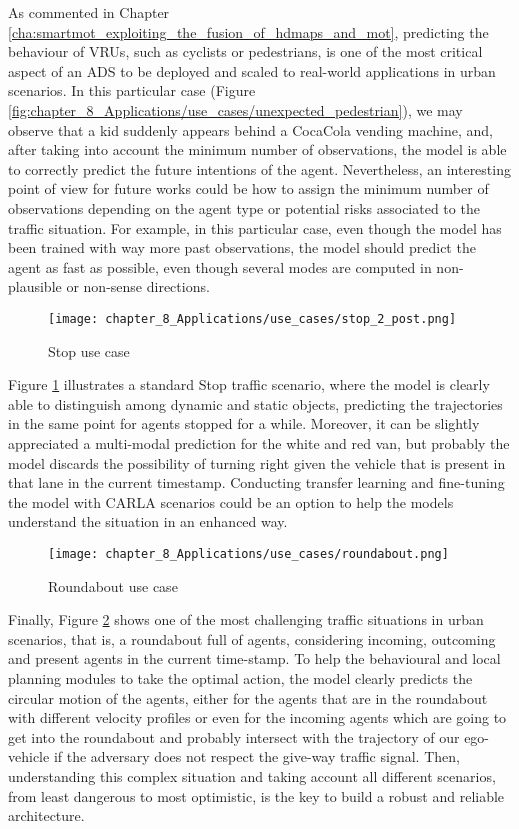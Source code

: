As commented in Chapter \ref{cha:smartmot_exploiting_the_fusion_of_hdmaps_and_mot}, predicting the behaviour of \acp{VRU}, such as cyclists or pedestrians, is one of the most critical aspect of an \ac{ADS} to be deployed and scaled to real-world applications in urban scenarios. In this particular case (Figure \ref{fig:chapter_8_Applications/use_cases/unexpected_pedestrian}), we may observe that a kid suddenly appears behind a CocaCola vending machine, and, after taking into account the minimum number of observations, the model is able to correctly predict the future intentions of the agent. Nevertheless, an interesting point of view for future works could be how to assign the minimum number of observations depending on the agent type or potential risks associated to the traffic situation. For example, in this particular case, even though the model has been trained with way more past observations, the model should predict the agent as fast as possible, even though several modes are computed in non-plausible or non-sense directions.

\begin{figure}[!h]
	\centering
	\texttt{[image: chapter\_8\_Applications/use\_cases/stop\_2\_post.png]}
	\caption{Stop use case}
	\label{fig:chapter_8_Applications/use_cases/stop}
\end{figure}

Figure \ref{fig:chapter_8_Applications/use_cases/stop} illustrates a standard Stop traffic scenario, where the model is clearly able to distinguish among dynamic and static objects, predicting the trajectories in the same point for agents stopped for a while. Moreover, it can be slightly appreciated a multi-modal prediction for the white and red van, but probably the model discards the possibility of turning right given the vehicle that is present in that lane in the current timestamp. Conducting transfer learning and fine-tuning the model with \ac{CARLA} scenarios could be an option to help the models understand the situation in an enhanced way.  

\begin{figure}[!h]
	\centering
	\texttt{[image: chapter\_8\_Applications/use\_cases/roundabout.png]}
	\caption{Roundabout use case}
	\label{fig:chapter_8_Applications/use_cases/roundabout}
\end{figure}

Finally, Figure \ref{fig:chapter_8_Applications/use_cases/roundabout} shows one of the most challenging traffic situations in urban scenarios, that is, a roundabout full of agents, considering incoming, outcoming and present agents in the current time-stamp. To help the behavioural and local planning modules to take the optimal action, the model clearly predicts the circular motion of the agents, either for the agents that are in the roundabout with different velocity profiles or even for the incoming agents which are going to get into the roundabout and probably intersect with the trajectory of our ego-vehicle if the adversary does not respect the give-way traffic signal. Then, understanding this complex situation and taking account all different scenarios, from least dangerous to most optimistic, is the key to build a robust and reliable architecture.

